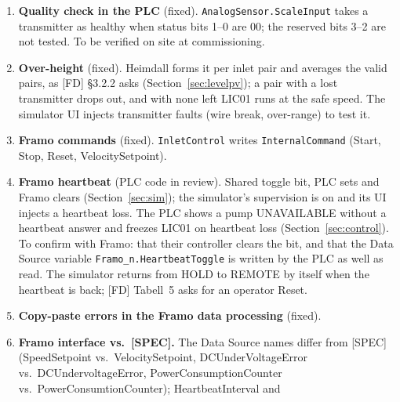\documentclass[11pt]{article}
\begin{document}
\begin{enumerate}
        (0--2047, 20\,mA $=$ \texttt{0x7FF0}); bit 15 is the sign, always 0 for 4--20\,mA, and
        WAGO counts it in the stated 12-bit resolution. Bits 3--2 are reserved and bits 1--0 are
        diagnostics [W455]. WAGO Germany confirmed this layout on 7 October 2026 and called older
        tables (value in bits 14--3, 20\,mA $=$ \texttt{0x7FF8}) inconsistent. On a 2\,m span one
        step is 0.98\,mm, so the over-height, the difference of two readings, moves in steps of
        about 1\,mm against level setpoints of 5\,mm in O-60 and S-75. The simulator serves this
        layout. Heimdall's \texttt{RawMax} of 32760 reads 20\,mA as 99.98\,\% of span.
  \item \textbf{Quality check in the PLC} (fixed). \texttt{AnalogSensor.ScaleInput} takes a
        transmitter as healthy when status bits 1--0 are 00; the reserved bits 3--2 are not
        tested. To be verified on site at commissioning.
  \item \textbf{Over-height} (fixed). Heimdall forms it per inlet pair and averages the valid
        pairs, as [FD] §3.2.2 asks (Section~\ref{sec:levelpv}); a pair with a
        lost transmitter drops out, and with none left LIC01 runs at the safe speed. The simulator
        UI injects transmitter faults (wire break, over-range) to test it.
  \item \textbf{Framo commands} (fixed). \texttt{InletControl} writes
        \texttt{InternalCommand} (Start, Stop, Reset, VelocitySetpoint).
  \item \textbf{Framo heartbeat} (PLC code in review). Shared toggle bit, PLC sets and Framo clears
        (Section~\ref{sec:sim}); the simulator's supervision is on and its UI injects a heartbeat
        loss. The PLC shows a pump UNAVAILABLE without a heartbeat answer and freezes LIC01 on
        heartbeat loss (Section~\ref{sec:control}). To confirm with Framo: that their controller
        clears the bit, and that the Data Source variable \texttt{Framo\_n.HeartbeatToggle} is
        written by the PLC as well as read. The simulator returns from HOLD to REMOTE by itself
        when the heartbeat is back; [FD] Tabell~5 asks for an operator Reset.
  \item \textbf{Copy-paste errors in the Framo data processing} (fixed).
  \item \textbf{Framo interface vs.\ [SPEC].} The Data Source names differ from [SPEC]
        (SpeedSetpoint vs.\ VelocitySetpoint, DCUnderVoltageError vs.\ DCUndervoltageError,
        PowerConsumptionCounter vs.\ PowerConsumtionCounter); HeartbeatInterval and

\end{enumerate}
\end{document}
